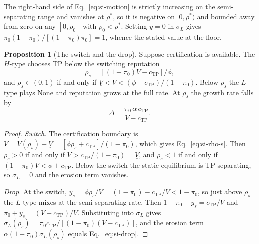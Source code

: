 \documentclass[11pt,letterpaper]{article}
\theoremstyle{definition}
\newtheorem{proposition}{Proposition}[section]
\begin{document}
The right-hand side of Eq.~\ref{eq:si-motion} is strictly increasing on the
semi-separating range and vanishes at $\rho^{*}$, so it is negative on
$[0, \rho^{*})$ and bounded away from zero on any $[0, \rho_0]$ with
$\rho_0 < \rho^{*}$. Setting $y = 0$ in $\sigma_L$ gives
$\pi_0(1 - \pi_0)/[(1 - \pi_0)\pi_0] = 1$, whence the stated value at the floor.

\begin{proposition}[The switch and the drop]\label{prop:dyn-switch}
Suppose certification is available. The $H$-type chooses TP below the switching
reputation
\begin{equation}
\rho_s = [(1 - \pi_0)V - c_{\text{TP}}]/\phi ,
\label{eq:si-rho-s}
\end{equation}
and $\rho_s \in (0, 1)$ if and only if
$\underline{V} < V < (\phi + c_{\text{TP}})/(1 - \pi_0)$. Below $\rho_s$ the $L$-type plays None and reputation grows at the full rate. At $\rho_s$ the
growth rate falls by
\begin{equation}
\Delta = \frac{\pi_0\,\alpha\,c_{\text{TP}}}{V - c_{\text{TP}}} .
\label{eq:si-drop}
\end{equation}
\end{proposition}

\begin{proof}
\textit{Switch.} The certification boundary is
$V = \bar{V}(\rho_s) + \underline{V} = [\phi\rho_s + c_{\text{TP}}]/(1 - \pi_0)$,
which gives Eq.~\ref{eq:si-rho-s}. Then $\rho_s > 0$ if and only if
$V > c_{\text{TP}}/(1 - \pi_0) = \underline{V}$, and $\rho_s < 1$ if and only if
$(1 - \pi_0)V < \phi + c_{\text{TP}}$. Below the switch the static equilibrium
is TP-separating, so $\sigma_L = 0$ and the erosion term vanishes.

\textit{Drop.} At the switch,
$y_s = \phi\rho_s/V = (1 - \pi_0) - c_{\text{TP}}/V < 1 - \pi_0$, so just above
$\rho_s$ the $L$-type mixes at the semi-separating rate. Then
$1 - \pi_0 - y_s = c_{\text{TP}}/V$ and $\pi_0 + y_s = (V - c_{\text{TP}})/V$.
Substituting into $\sigma_L$ gives
$\sigma_L(\rho_s) = \pi_0 c_{\text{TP}}/[(1 - \pi_0)(V - c_{\text{TP}})]$, and
the erosion term $\alpha(1 - \pi_0)\sigma_L(\rho_s)$ equals
Eq.~\ref{eq:si-drop}.
\end{proof}
\end{document}
